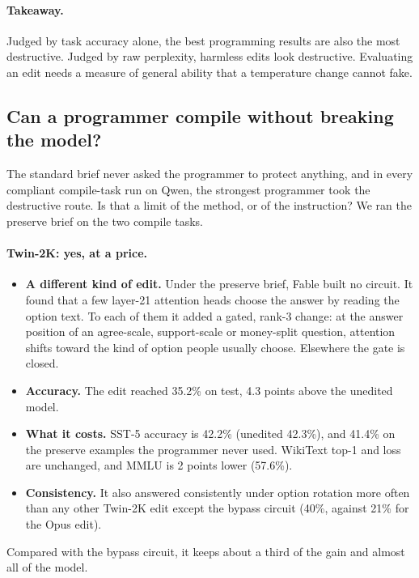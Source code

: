\paragraph{Takeaway.} Judged by task accuracy alone, the best programming results are also the most destructive. Judged by raw perplexity, harmless edits look destructive. Evaluating an edit needs a measure of general ability that a temperature change cannot fake.

\subsection{Can a programmer compile without breaking the model?}
\label{sec:preserve}
The standard brief never asked the programmer to protect anything, and in every compliant compile-task run on Qwen, the strongest programmer took the destructive route. Is that a limit of the method, or of the instruction? We ran the preserve brief on the two compile tasks.

\paragraph{Twin-2K: yes, at a price.}
\begin{itemize}
  \item \textbf{A different kind of edit.} Under the preserve brief, Fable built no circuit. It found that a few layer-21 attention heads choose the answer by reading the option text. To each of them it added a gated, rank-3 change: at the answer position of an agree-scale, support-scale or money-split question, attention shifts toward the kind of option people usually choose. Elsewhere the gate is closed.
  \item \textbf{Accuracy.} The edit reached 35.2\% on test, 4.3 points above the unedited model.
  \item \textbf{What it costs.} SST-5 accuracy is 42.2\% (unedited 42.3\%), and 41.4\% on the preserve examples the programmer never used. WikiText top-1 and loss are unchanged, and MMLU is 2 points lower (57.6\%).
  \item \textbf{Consistency.} It also answered consistently under option rotation more often than any other Twin-2K edit except the bypass circuit (40\%, against 21\% for the Opus edit).
\end{itemize}
Compared with the bypass circuit, it keeps about a third of the gain and almost all of the model.

